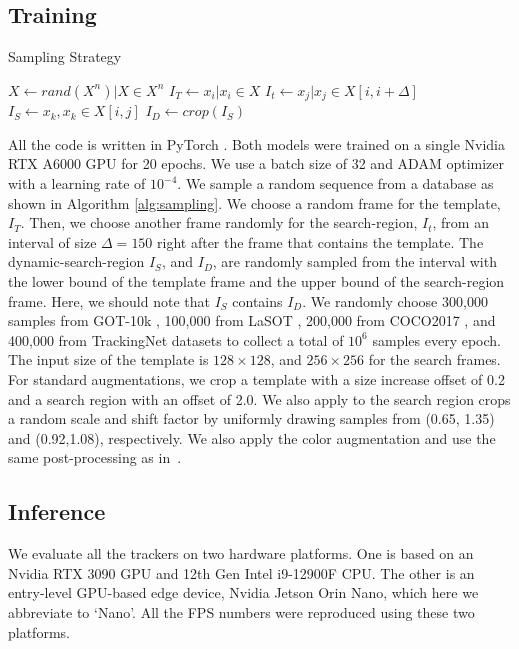   \subsection{Training}
  \begin{algorithm}
	\centering
	\caption{Sampling Strategy}\label{alg:sampling}
	\begin{algorithmic}
	\State $X \gets rand(X^n) | X \in X^n$ 
	\State $I_T \gets x_i |  x_i \in X$ 
	\State $I_t \gets x_j | x_j \in X[i, i+\Delta]$  
	\State $I_S \gets x_k, x_k \in X[i, j]$ 
	\State $I_D \gets crop(I_S)$ 
	\end{algorithmic}
  \end{algorithm}
  All the code is written in PyTorch \cite{paszke2019pytorch}. Both models were trained on a single Nvidia RTX A6000 GPU for 20 epochs. We use a batch size of 32 and ADAM optimizer \cite{kingma2014adam} with a learning rate of $10^{-4}$. We sample a random sequence from a database as shown in Algorithm \ref{alg:sampling}. We choose a random frame for the template, $I_T$. Then, we choose another frame randomly for the search-region, $I_t$, from an interval of size $\Delta=150$ right after the frame that contains the template. The dynamic-search-region $I_S$, and $I_D$, are randomly sampled from the interval with the lower bound of the template frame and the upper bound of the search-region frame. Here, we should note that $I_S$ contains $I_D$. We randomly choose 300,000 samples from GOT-10k \cite{Huang2021}, 100,000 from LaSOT \cite{fan2021lasot}, 200,000 from COCO2017 \cite{lin2014microsoft}, and 400,000 from TrackingNet \cite{muller2018trackingnet} datasets to collect a total of $10^6$ samples every epoch. The input size of the template is $128\times128$, and $256\times256$ for the search frames. For standard augmentations, we crop a template with a size increase offset of 0.2 and a search region with an offset of 2.0. We also apply to the search region crops a random scale and shift factor by uniformly drawing samples from (0.65, 1.35) and (0.92,1.08), respectively. We also apply the color augmentation and use the same post-processing as in~\cite{bertinetto2016fully}.
  

  

  \subsection{Inference}
  We evaluate all the trackers on two hardware platforms. One is based on an Nvidia RTX 3090 GPU and 12th Gen Intel i9-12900F CPU. The other is an entry-level GPU-based edge device, Nvidia Jetson Orin Nano, which here we abbreviate to `Nano'. All the FPS numbers were reproduced using these two platforms. 
  
